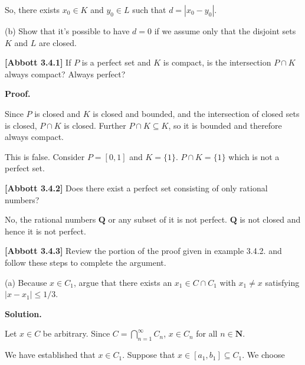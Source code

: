 \documentclass[10pt]{article}
\begin{document}
So, there exists $\displaystyle x_{0} \in K$ and $\displaystyle y_{0} \in L$ such that $\displaystyle d=|x_{0} -y_{0} |$.



(b) Show that it's possible to have $\displaystyle d=0$ if we assume only that the disjoint sets $\displaystyle K$ and $\displaystyle L$ are closed. 



\textbf{[Abbott 3.4.1]} If $\displaystyle P$ is a perfect set and $\displaystyle K$ is compact, is the intersection $\displaystyle P\cap K$ always compact? Always perfect?



\textbf{Proof.}



Since $\displaystyle P$ is closed and $\displaystyle K$ is closed and bounded, and the intersection of closed sets is closed, $\displaystyle P\cap K$ is closed. Further $\displaystyle P\cap K\subseteq K$, so it is bounded and therefore always compact. 



This is false. Consider $\displaystyle P=[ 0,1]$ and $\displaystyle K=\{1\}$. $\displaystyle P\cap K=\{1\}$ which is not a perfect set.



\textbf{[Abbott 3.4.2]} Does there exist a perfect set consisting of only rational numbers?



No, the rational numbers $\displaystyle \mathbf{Q}$ or any subset of it is not perfect. $\displaystyle \mathbf{Q}$ is not closed and hence it is not perfect.



\textbf{[Abbott 3.4.3]} Review the portion of the proof given in example 3.4.2. and follow these steps to complete the argument.



(a) Because $\displaystyle x\in C_{1}$, argue that there exists an $\displaystyle x_{1} \in C\cap C_{1}$ with $\displaystyle x_{1} \neq x$ satisfying $\displaystyle |x-x_{1} |\leq 1/3$.



\textbf{Solution.}



Let $\displaystyle x\in C$ be arbitrary. Since $\displaystyle C=\bigcap _{n=1}^{\infty } C_{n}$, $\displaystyle x\in C_{n}$ for all $\displaystyle n\in \mathbf{N}$.



We have established that $\displaystyle x\in C_{1}$. Suppose that $\displaystyle x\in [ a_{1} ,b_{1}] \subseteq C_{1}$. We choose 
\end{document}
